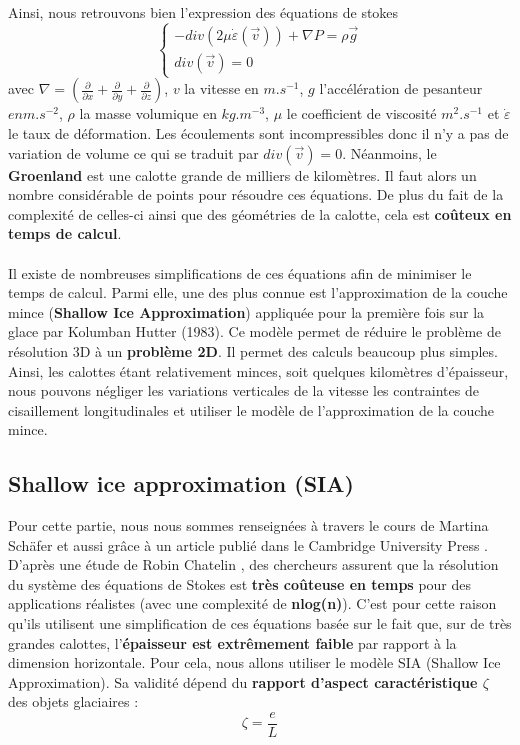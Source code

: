 \documentclass{article}
\begin{document}
Ainsi, nous retrouvons bien l'expression des équations de stokes 
\begin{equation}
\left\{
\begin{array}{l}
-div(2 \mu \dot \varepsilon(\vec{v})) + \nabla P = \rho \vec{g} \\
div(\vec{v}) = 0 \qquad
\end{array}
\right.
\label{eq1}
\end{equation}
avec $\nabla = ( \frac{\partial}{\partial x} + \frac{\partial}{\partial y} + \frac{\partial}{\partial z})$, $v$ la vitesse en $m.s^{-1}$, $g$ l'accélération de pesanteur $en m.s^{-2}$, $\rho$ la masse volumique en $kg.m^{-3}$, $\mu$ le coefficient de viscosité $m^{2}.s^{-1}$ et $\dot \varepsilon$ le taux de déformation. Les écoulements sont incompressibles donc il n'y a pas de variation de volume ce qui se traduit par $div(\vec{v}) = 0$.
\newpage
Néanmoins, le \textbf{Groenland} est une calotte grande de milliers de kilomètres. Il faut alors un nombre considérable de points pour résoudre ces équations. De plus du fait de la complexité de celles-ci ainsi que des géométries de la calotte, cela est \textbf{coûteux en temps de calcul}. 
\\\\
Il existe de nombreuses simplifications de ces équations afin de minimiser le temps de calcul. Parmi elle, une des plus connue est l'approximation de la couche mince (\textbf{Shallow Ice Approximation}) appliquée pour la première fois sur la glace par Kolumban Hutter (1983). Ce modèle permet de réduire le problème de résolution 3D à un \textbf{problème 2D}. Il permet des calculs beaucoup plus simples. Ainsi, les calottes étant relativement minces, soit quelques kilomètres d'épaisseur, nous pouvons négliger les variations verticales de la vitesse les contraintes de cisaillement longitudinales et utiliser le modèle de l'approximation de la couche mince.
\newline

\subsection{Shallow ice approximation (SIA)}


Pour cette partie, nous nous sommes renseignées à travers le cours de Martina Schäfer \cite{schafer2007modelisation} et aussi grâce à un article publié dans le Cambridge University Press  \cite{seroussi_morlighem_rignot_khazendar_larour_mouginot_2013}.
\newline
D'après une étude de Robin Chatelin \cite{site3}, des chercheurs assurent que la résolution du système des équations de Stokes est \textbf{très coûteuse en temps} pour des applications réalistes (avec une complexité de \textbf{nlog(n)}). C'est pour cette raison qu'ils utilisent une simplification de ces équations basée sur le fait que, sur de très grandes calottes, l'\textbf{épaisseur est extrêmement faible} par rapport à la dimension horizontale. Pour cela, nous allons utiliser le modèle SIA (Shallow Ice Approximation). Sa validité dépend du \textbf{rapport d'aspect caractéristique $\zeta$} des objets glaciaires :
\begin{equation}
\zeta = \frac{e}{L}
\label{eq2} 
\end{equation}
\end{document}

